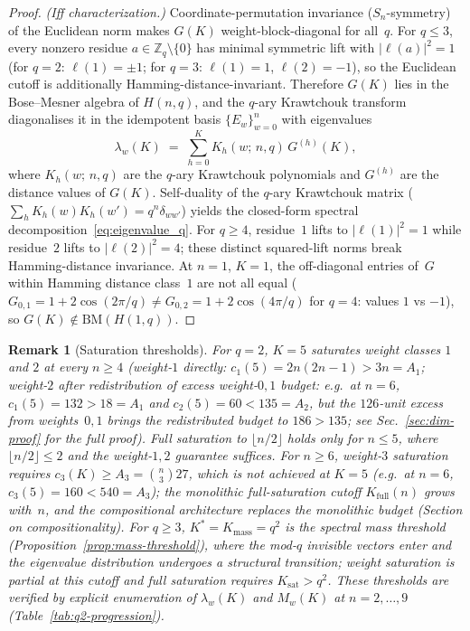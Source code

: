 \documentclass[twocolumn,prx,aps,superscriptaddress,longbibliography]{revtex4-2}
\newtheorem*{remark}{Remark}
\begin{document}
\begin{proof}
\emph{(Iff characterization.)}
Coordinate-permutation invariance ($S_n$-symmetry) of the
Euclidean norm makes $G(K)$ weight-block-diagonal for all~$q$.
For $q \le 3$, every nonzero residue $a \in \mathbb{Z}_q \setminus
\{0\}$ has minimal symmetric lift with $|\ell(a)|^2 = 1$
(for $q = 2$: $\ell(1) = \pm 1$; for $q = 3$: $\ell(1) = 1$,
$\ell(2) = -1$), so the Euclidean cutoff is additionally
Hamming-distance-invariant.  Therefore $G(K)$ lies in the
Bose--Mesner algebra of $H(n,q)$, and the $q$-ary Krawtchouk
transform diagonalises it in the idempotent basis
$\{E_w\}_{w=0}^{n}$ with eigenvalues
\[
  \lambda_w(K) \;=\; \sum_{h=0}^{K} K_h(w;\,n,q)\,G^{(h)}(K),
\]
where $K_h(w;\,n,q)$ are the $q$-ary Krawtchouk polynomials and
$G^{(h)}$ are the distance values of $G(K)$.
Self-duality of the $q$-ary Krawtchouk matrix
($\sum_h K_h(w) K_h(w') = q^n \delta_{ww'}$) yields the closed-form
spectral decomposition~\eqref{eq:eigenvalue_q}.
For $q \ge 4$, residue~$1$ lifts to $|\ell(1)|^2 = 1$ while
residue~$2$ lifts to $|\ell(2)|^2 = 4$; these distinct squared-lift
norms break Hamming-distance invariance.
At $n = 1$, $K = 1$, the off-diagonal entries of~$G$ within
Hamming distance class~$1$ are not all equal
($G_{0,1} = 1 + 2\cos(2\pi/q) \ne G_{0,2} = 1 + 2\cos(4\pi/q)$
for $q = 4$: values $1$ vs $-1$), so
$G(K) \notin \mathrm{BM}(H(1,q))$.
\end{proof}

\begin{remark}[Saturation thresholds]
For $q = 2$, $K = 5$ saturates weight classes $1$ and $2$ at every
$n \ge 4$ (weight-$1$ directly: $c_1(5) = 2n(2n{-}1) > 3n = A_1$;
weight-$2$ after redistribution of excess weight-$0,1$ budget:
e.g.\ at $n = 6$, $c_1(5) = 132 > 18 = A_1$ and
$c_2(5) = 60 < 135 = A_2$, but the $126$-unit excess from
weights~$0,1$ brings the redistributed budget to $186 > 135$;
see Sec.~\ref{sec:dim-proof} for the full proof).
Full saturation to $\lfloor n/2 \rfloor$ holds only for
$n \le 5$, where $\lfloor n/2 \rfloor \le 2$ and the weight-$1,2$
guarantee suffices.
For $n \ge 6$, weight-$3$ saturation requires
$c_3(K) \ge A_3 = \binom{n}{3} 27$, which is not achieved at $K = 5$
(e.g.\ at $n = 6$, $c_3(5) = 160 < 540 = A_3$); the monolithic
full-saturation cutoff $K_{\mathrm{full}}(n)$ grows with~$n$, and
the compositional architecture replaces the monolithic budget
(Section on compositionality).
For $q \ge 3$, $K^* = K_{\mathrm{mass}} = q^2$ is the spectral
mass threshold (Proposition~\ref{prop:mass-threshold}), where
the mod-$q$ invisible vectors enter and the eigenvalue
distribution undergoes a structural transition; weight
saturation is partial at this cutoff and full saturation
requires $K_{\mathrm{sat}} > q^2$.
These thresholds are verified by explicit enumeration of
$\lambda_w(K)$ and $M_w(K)$ at $n = 2,\ldots,9$
(Table~\ref{tab:q2-progression}).
\end{remark}
\end{document}
